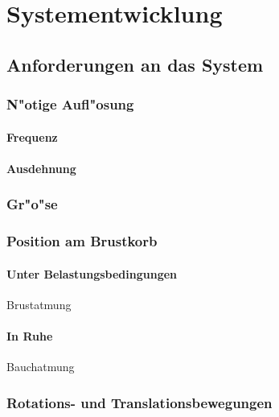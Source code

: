 
\lhead[\chaptername~\thechapter]{\rightmark}


\rhead[\leftmark]{}


\lfoot[\thepage]{}


\cfoot{}


\rfoot[]{\thepage}


\chapter{Systementwicklung}

\section{Anforderungen an das System}

	\subsection{N"otige Aufl"osung}
	
		\subsubsection*{Frequenz}
		
		\subsubsection*{Ausdehnung}

	\subsection{Gr"o"se}
	
	\subsection{Position am Brustkorb}
	
		\subsubsection*{Unter Belastungsbedingungen}
		Brustatmung
		
		\subsubsection*{In Ruhe}
		Bauchatmung
	
	\subsection{Rotations- und Translationsbewegungen}
	
